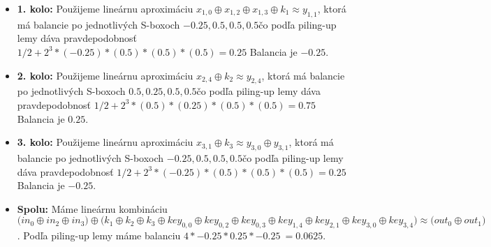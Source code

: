 \begin{itemize}
\item {\bf 1. kolo:}
Použijeme lineárnu aproximáciu $
x_{1,0} \oplus x_{1,2} \oplus x_{1,3}  \oplus k_{1} 
 \approx 
y_{1,1} $,
ktorá má balancie po jednotlivých S-boxoch $
-0.25,0.5,0.5,0.5
$čo podľa piling-up lemy dáva pravdepodobnosť 
$1/2 + 2^3*( -0.25)*(0.5)*(0.5)*(0.5 )= 0.25 $
Balancia je $-0.25$.

\item {\bf 2. kolo:}
Použijeme lineárnu aproximáciu $
x_{2,4}  \oplus k_{2} 
 \approx 
y_{2,4} $,
ktorá má balancie po jednotlivých S-boxoch $
0.5,0.25,0.5,0.5
$čo podľa piling-up lemy dáva pravdepodobnosť 
$1/2 + 2^3*( 0.5)*(0.25)*(0.5)*(0.5 )= 0.75 $
Balancia je $0.25$.

\item {\bf 3. kolo:}
Použijeme lineárnu aproximáciu $
x_{3,1}  \oplus k_{3} 
 \approx 
y_{3,0} \oplus y_{3,1} $,
ktorá má balancie po jednotlivých S-boxoch $
-0.25,0.5,0.5,0.5
$čo podľa piling-up lemy dáva pravdepodobnosť 
$1/2 + 2^3*( -0.25)*(0.5)*(0.5)*(0.5 )= 0.25 $
Balancia je $-0.25$.

\item {\bf Spolu:}  Máme lineárnu kombináciu $ \Big(
in_{0} \oplus in_{2} \oplus in_{3}
\Big) \oplus \Big( k_1 \oplus k_2 \oplus k_3 \oplus 
key_{0,0} \oplus key_{0,2} \oplus key_{0,3} \oplus key_{1,4} \oplus key_{2,1} \oplus key_{3,0} \oplus key_{3,4} \Big) \approx \Big(
out_{0} \oplus out_{1}
\Big) $.
Podľa piling-up lemy máme balanciu $4* -0.25*0.25*-0.25 ~= 0.0625 $.
\end{itemize}
